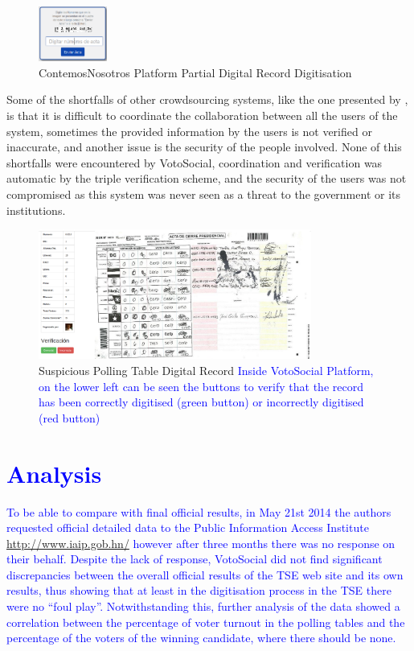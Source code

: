 \documentclass[letterpaper,10pt]{article}
\begin{document}
\begin{figure}[h!]
    \centering
    \includegraphics[width=0.2\textwidth]{images/salvador}
    \caption{ContemosNosotros Platform Partial Digital Record Digitisation}
    \label{fig:salvador}
\end{figure}


Some of the shortfalls of other crowdsourcing systems, like the one presented by \cite{gao2011}, is that it is difficult to coordinate the collaboration between all the users of the system, sometimes the provided information by the users is not verified or inaccurate, and another issue is the security of the people involved. None of this shortfalls were encountered by VotoSocial, coordination and verification was automatic by the triple verification scheme, and the security of the users was not compromised as this system was never seen as a threat to the government or its institutions.

\begin{figure}[h!]
    \centering
    \includegraphics[width=0.8\textwidth]{images/vs-valid-strange}
    \caption{Suspicious Polling Table Digital Record\textcolor{blue}{ Inside VotoSocial Platform, on the lower left can be seen the buttons to verify that the record has been correctly digitised (green button) or incorrectly digitised (red button)}}
    \label{fig:strange}
\end{figure}





\section{\textcolor{blue}{Analysis}}

\textcolor{blue}{To be able to compare with final official results, in May 21st 2014 the authors requested official detailed data to the Public Information Access Institute \url{http://www.iaip.gob.hn/} however after three months there was no response on their behalf. Despite the lack of response, VotoSocial did not find significant discrepancies between the overall official results of the TSE web site and its own results, thus showing that at least in the digitisation process in the TSE there were no ``foul play''. Notwithstanding this, further analysis of the data showed a correlation between the percentage of voter turnout in the polling tables and the percentage of the voters of the winning candidate, where there should be none.}
\end{document}
